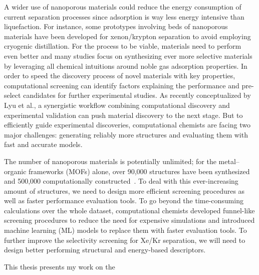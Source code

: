 A wider use of nanoporous materials could reduce the energy consumption of current separation processes since adsorption is way less energy intensive than liquefaction.\autocite{national2019research} For instance, some prototypes involving beds of nanoporous materials have been developed for xenon/krypton separation to avoid employing cryogenic distillation.\autocite{Banerjee2018} For the process to be viable, materials need to perform even better and many studies focus on synthesizing ever more selective materials by leveraging all chemical intuitions around noble gas adsorption properties.\autocite{Chen_2014, Li_2019, Pei_2022} In order to speed the discovery process of novel materials with key properties, computational screening can identify factors explaining the performance and pre-select candidates for further experimental studies. As recently conceptualized by Lyu et al., a synergistic workflow combining computational discovery and experimental validation can push material discovery to the next stage.\autocite{Lyu_2020, Jablonka_2022} But to efficiently guide experimental discoveries, computational chemists are facing two major challenges: generating reliably more structures and evaluating them with fast and accurate models.

The number of nanoporous materials is potentially unlimited; for the metal--organic frameworks (MOFs) alone, over 90,000 structures have been synthesized~\autocite{Groom_2016} and 500,000 computationally constructed~\autocite{Wilmer_2012,Boyd_2016,Colon_2017}. To deal with this ever-increasing amount of structures, we need to design more efficient screening procedures as well as faster performance evaluation tools. To go beyond the time-consuming calculations over the whole dataset, computational chemists developed funnel-like screening procedures to reduce the need for expensive simulations and introduced machine learning (ML) models to replace them with faster evaluation tools.\autocite{Ren_2022} To further improve the selectivity screening for Xe/Kr separation, we will need to design better performing structural and energy-based descriptors.

\begin{center}
\end{center}

This thesis presents my work on the 




\vfill
\begin{center}
\end{center}
\vfill\vfill